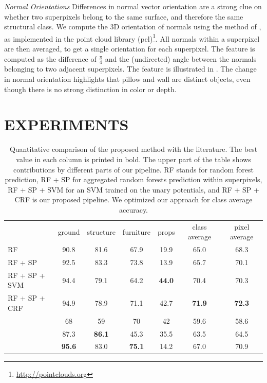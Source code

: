 \documentclass[a4paper, 10pt, conference]{ieeeconf}      %
\begin{document}
\emph{Normal Orientations}
    Differences in normal vector orientation are a strong clue on
    whether two superpixels belong to the same surface, and therefore the
    same structural class.
    We compute the 3D orientation of normals using the method of \citet{holz_2011_robocup},
    as implemented in the point cloud library (pcl)\footnote{\url{http://pointclouds.org}}.
    All normals within a superpixel are then averaged, to get a single orientation for each superpixel.
    The feature is computed as the difference of $\frac{\pi}{4}$ and the (undirected) angle between the normals belonging
    to two adjacent superpixels.  
    The feature is illustrated in . The change
    in normal orientation highlights that pillow and wall are distinct
    objects, even though there is no strong distinction in color or depth.


\section{EXPERIMENTS}

\begin{table}[t]
\centering
\begin{tabularx}{\linewidth}{@{\extracolsep{\fill}}lcccccc}
\toprule
                        & ground        &  structure    & furniture     & props         & class average   & pixel average\\
\cmidrule(r){1-7}

RF                      &         90.8  &   81.6        & 67.9          & 19.9          &  65.0        &  68.3 \\
RF + SP                 &         92.5  &   83.3        & 73.8          & 13.9          &  65.7        &  70.1 \\ 
RF + SP + SVM           &         94.4  &   79.1        & 64.2          & \textbf{44.0} &  70.4        &  70.3 \\
RF + SP + CRF           &         94.9  &   78.9        &          71.1 & 42.7          &\textbf{71.9} &  \textbf{72.3} \\
\cmidrule(r){1-7}
\citet{SilbermanECCV12} &         68    &   59          & 70           & 42            &  59.6        & 58.6 \\
\citet{couprie-iclr-13} &         87.3  & \textbf{86.1} & 45.3         & 35.5          &  63.5        & 64.5 \\
\citet{stueckler2013}   & \textbf{95.6} &   83.0        & \textbf{75.1}& 14.2          &  67.0        & 70.9 \\

\bottomrule
\end{tabularx}
    \caption{Quantitative comparison of the proposed method with the
literature. The best value in each column is printed in bold. The upper part of
the table shows contributions by different parts of our pipeline. RF stands for random forest prediction, RF + SP for aggregated
random forests prediction within superpixels, RF + SP + SVM for an SVM trained on the unary potentials, and RF + SP + CRF is
our proposed pipeline. We optimized our approach for class average
accuracy.}
\end{table}
\end{document}
